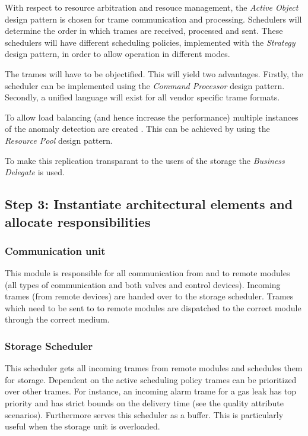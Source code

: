 \npar With respect to resource arbitration and resouce management, the
\emph{Active Object} design pattern is chosen for trame communication and
processing. Schedulers will determine the order in which trames are received,
processed and sent. These schedulers will have different scheduling policies,
implemented with the \emph{Strategy} design pattern, in order to allow operation
in different modes.

\npar The trames will have to be objectified. This will yield two advantages.
Firstly, the scheduler can be implemented using the \emph{Command Processor}
design pattern. Secondly, a unified language will exist for all vendor
specific trame formats. 

\npar To allow load balancing (and hence increase the performance) multiple
instances of the anomaly detection are created . This can be achieved by using
the \emph{Resource Pool} design pattern. 

To make this replication transparant to the users of the storage the
\emph{Business Delegate} is used.

\subsection{Step 3: Instantiate architectural elements and allocate responsibilities}
\label{add:it1/elements}


\subsubsection{Communication unit}

\npar This module is responsible for all communication from and to remote
modules (all types of communication and both valves and control devices).
Incoming trames (from remote devices) are handed over to the storage scheduler.
Trames which need to be sent to to remote modules are dispatched to the correct
module through the correct medium.

\subsubsection{Storage Scheduler}

\npar This scheduler gets all incoming trames from remote modules and schedules
them for storage. Dependent on the active scheduling policy trames can be
prioritized over other trames. For instance, an incoming alarm trame for a gas
leak has top priority and has strict bounds on the delivery time (see the
quality attribute scenarios). Furthermore serves this scheduler as a buffer.
This is particularly useful when the storage unit is overloaded.

